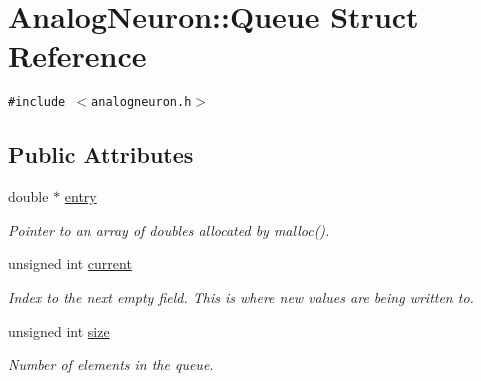 \hypertarget{structAnalogNeuron_1_1Queue}{
\section{Analog\-Neuron::Queue Struct Reference}
\label{structAnalogNeuron_1_1Queue}
}
{\tt \#include $<$analogneuron.h$>$}

\subsection*{Public Attributes}
\begin{CompactItemize}
\item 
\hypertarget{structAnalogNeuron_1_1Queue_o0}{
double $\ast$ \hyperlink{structAnalogNeuron_1_1Queue_o0}{entry}}
\label{structAnalogNeuron_1_1Queue_o0}

\begin{CompactList}\small\item\em Pointer to an array of doubles allocated by malloc(). \item\end{CompactList}\item 
\hypertarget{structAnalogNeuron_1_1Queue_o1}{
unsigned int \hyperlink{structAnalogNeuron_1_1Queue_o1}{current}}
\label{structAnalogNeuron_1_1Queue_o1}

\begin{CompactList}\small\item\em Index to the next empty field. This is where new values are being written to. \item\end{CompactList}\item 
\hypertarget{structAnalogNeuron_1_1Queue_o2}{
unsigned int \hyperlink{structAnalogNeuron_1_1Queue_o2}{size}}
\label{structAnalogNeuron_1_1Queue_o2}

\begin{CompactList}\small\item\em Number of elements in the queue. \item\end{CompactList}\end{CompactItemize}
